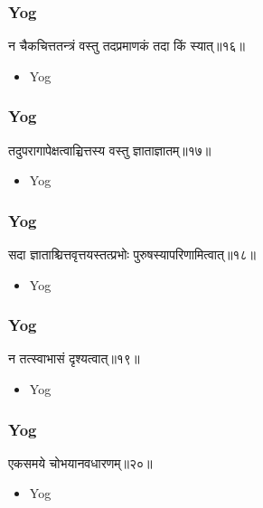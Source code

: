 \begin{frame}[fragile]\frametitle{Yog}
\begin{sanskrit}
न चैकचित्ततन्त्रं वस्तु तदप्रमाणकं तदा किं स्यात्॥१६॥
\end{sanskrit}
	\begin{itemize}
	\item Yog 
	\end{itemize}
\end{frame}


\begin{frame}[fragile]\frametitle{Yog}
\begin{sanskrit}
तदुपरागापेक्षत्वाच्चित्तस्य वस्तु ज्ञाताज्ञातम्॥१७॥
\end{sanskrit}
	\begin{itemize}
	\item Yog 
	\end{itemize}
\end{frame}


\begin{frame}[fragile]\frametitle{Yog}
\begin{sanskrit}
सदा ज्ञाताश्चित्तवृत्तयस्तत्प्रभोः पुरुषस्यापरिणामित्वात्॥१८॥
\end{sanskrit}
	\begin{itemize}
	\item Yog 
	\end{itemize}
\end{frame}



\begin{frame}[fragile]\frametitle{Yog}
\begin{sanskrit}
न तत्स्वाभासं दृश्यत्वात्॥१९॥
\end{sanskrit}
	\begin{itemize}
	\item Yog 
	\end{itemize}
\end{frame}

\begin{frame}[fragile]\frametitle{Yog}
\begin{sanskrit}
एकसमये चोभयानवधारणम्॥२०॥
\end{sanskrit}
	\begin{itemize}
	\item Yog 
	\end{itemize}
\end{frame}



